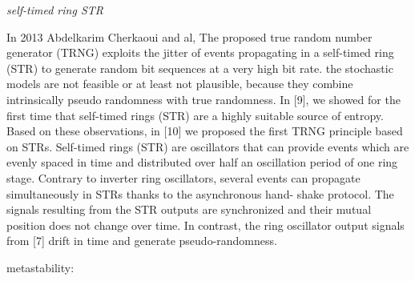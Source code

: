\textit{self-timed ring STR}

In 2013 Abdelkarim Cherkaoui and al, The proposed true random number generator (TRNG) exploits the jitter of events propagating in a self-timed ring (STR) to generate random bit sequences at a very high bit rate. the stochastic models are not feasible or at least not plausible, because they combine intrinsically pseudo randomness with true randomness. 
In [9], we showed for the first time that self-timed rings (STR) are a highly suitable source of entropy. Based on these observations, in [10] we proposed the first TRNG principle based on STRs. Self-timed rings (STR) are oscillators that can provide events which are evenly spaced in time and distributed over half an oscillation period of one ring stage. Contrary to inverter ring oscillators, several events can propagate simultaneously in STRs thanks to the asynchronous hand- shake protocol. The signals resulting from the STR outputs are synchronized and their mutual position does not change over time. In contrast, the ring oscillator output signals from [7] drift in time and generate pseudo-randomness.

metastability: